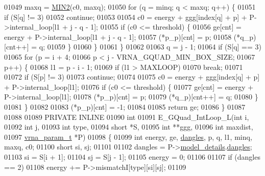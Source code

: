 \begin{DoxyCode}
01049     maxq  = \hyperlink{group__utils_gae0b9cd0ce090bd69b951aa73e8fa4f7d}{MIN2}(c0, maxq);
01050     \textcolor{keywordflow}{for} (q = minq; q < maxq; q++) \{
01051       \textcolor{keywordflow}{if} (S[q] != 3)
01052         \textcolor{keywordflow}{continue};
01053 
01054       c0 = energy + ggg[index[q] + p] + P->internal\_loop[l1 + j - q - 1];
01055       \textcolor{keywordflow}{if} (c0 <= threshold) \{
01056         ge[cnt]       = energy + P->internal\_loop[l1 + j - q - 1];
01057         (*p\_p)[cnt]   = p;
01058         (*q\_p)[cnt++] = q;
01059       \}
01060     \}
01061   \}
01062 
01063   q = j - 1;
01064   \textcolor{keywordflow}{if} (S[q] == 3)
01065     \textcolor{keywordflow}{for} (p = i + 4;
01066          p < j - VRNA\_GQUAD\_MIN\_BOX\_SIZE;
01067          p++) \{
01068       l1 = p - i - 1;
01069       \textcolor{keywordflow}{if} (l1 > MAXLOOP)
01070         \textcolor{keywordflow}{break};
01071 
01072       \textcolor{keywordflow}{if} (S[p] != 3)
01073         \textcolor{keywordflow}{continue};
01074 
01075       c0 = energy + ggg[index[q] + p] + P->internal\_loop[l1];
01076       \textcolor{keywordflow}{if} (c0 <= threshold) \{
01077         ge[cnt]       = energy + P->internal\_loop[l1];
01078         (*p\_p)[cnt]   = p;
01079         (*q\_p)[cnt++] = q;
01080       \}
01081     \}
01082 
01083   (*p\_p)[cnt] = -1;
01084 
01085   \textcolor{keywordflow}{return} ge;
01086 \}
01087 
01088 
01089 PRIVATE INLINE
01090 \textcolor{keywordtype}{int}
01091 E\_GQuad\_IntLoop\_L(\textcolor{keywordtype}{int}           i,
01092                   \textcolor{keywordtype}{int}           j,
01093                   \textcolor{keywordtype}{int}           type,
01094                   \textcolor{keywordtype}{short}         *S,
01095                   \textcolor{keywordtype}{int}           **ggg,
01096                   \textcolor{keywordtype}{int}           maxdist,
01097                   \hyperlink{group__energy__parameters_structvrna__param__s}{vrna\_param\_t}  *P)
01098 \{
01099   \textcolor{keywordtype}{int}   energy, ge, \hyperlink{group__model__details_ga72b511ed1201f7e23ec437e468790d74}{dangles}, p, q, l1, minq, maxq, c0;
01100   \textcolor{keywordtype}{short} si, sj;
01101 
01102   dangles = P->\hyperlink{group__energy__parameters_a7b84353eb9075c595bad4ceb871bcae7}{model\_details}.\hyperlink{group__model__details_adcda4ff2ea77748ae0e8700288282efc}{dangles};
01103   si      = S[i + 1];
01104   sj      = S[j - 1];
01105   energy  = 0;
01106 
01107   \textcolor{keywordflow}{if} (dangles == 2)
01108     energy += P->mismatchI[type][si][sj];
01109 

\end{DoxyCode}
